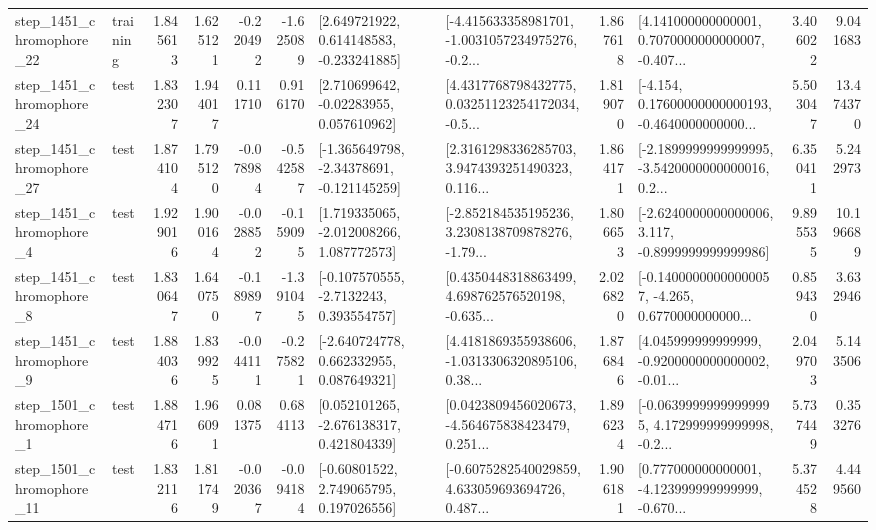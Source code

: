 \begin{tabular}{llrrrrllrlrr}
 step\_1451\_chromophore\_22 &  training &      1.845613 &    1.625121 &     -0.220492 & -1.625089 &    [2.649721922, 0.614148583, -0.233241885] &  [-4.415633358981701, -1.0031057234975276, -0.2... &       1.867618 &  [4.141000000000001, 0.7070000000000007, -0.407... &            3.406022 &          9.041683 \\
 step\_1451\_chromophore\_24 &      test &      1.832307 &    1.944017 &      0.111710 &  0.916170 &     [2.710699642, -0.02283955, 0.057610962] &  [4.4317768798432775, 0.03251123254172034, -0.5... &       1.819070 &  [-4.154, 0.17600000000000193, -0.4640000000000... &            5.503047 &         13.474370 \\
 step\_1451\_chromophore\_27 &      test &      1.874104 &    1.795120 &     -0.078984 & -0.542587 &   [-1.365649798, -2.34378691, -0.121145259] &  [2.3161298336285703, 3.9474393251490323, 0.116... &       1.864171 &  [-2.1899999999999995, -3.5420000000000016, 0.2... &            6.350411 &          5.242973 \\
  step\_1451\_chromophore\_4 &      test &      1.929016 &    1.900164 &     -0.028852 & -0.159095 &    [1.719335065, -2.012008266, 1.087772573] &  [-2.852184535195236, 3.2308138709878276, -1.79... &       1.806653 &  [-2.6240000000000006, 3.117, -0.8999999999999986] &            9.895535 &         10.196689 \\
  step\_1451\_chromophore\_8 &      test &      1.830647 &    1.640750 &     -0.189897 & -1.391045 &     [-0.107570555, -2.7132243, 0.393554757] &  [0.4350448318863499, 4.698762576520198, -0.635... &       2.026820 &  [-0.14000000000000057, -4.265, 0.6770000000000... &            0.859430 &          3.632946 \\
  step\_1451\_chromophore\_9 &      test &      1.884036 &    1.839925 &     -0.044111 & -0.275821 &    [-2.640724778, 0.662332955, 0.087649321] &  [4.4181869355938606, -1.0313306320895106, 0.38... &       1.876846 &  [4.045999999999999, -0.9200000000000002, -0.01... &            2.049703 &          5.143506 \\
  step\_1501\_chromophore\_1 &      test &      1.884716 &    1.966091 &      0.081375 &  0.684113 &    [0.052101265, -2.676138317, 0.421804339] &  [0.0423809456020673, -4.564675838423479, 0.251... &       1.896234 &  [-0.06399999999999995, 4.172999999999998, -0.2... &            5.737449 &          0.353276 \\
 step\_1501\_chromophore\_11 &      test &      1.832116 &    1.811749 &     -0.020367 & -0.094184 &     [-0.60801522, 2.749065795, 0.197026556] &  [-0.6075282540029859, 4.633059693694726, 0.487... &       1.906181 &  [0.777000000000001, -4.123999999999999, -0.670... &            5.374528 &          4.449560 \\

\end{tabular}
